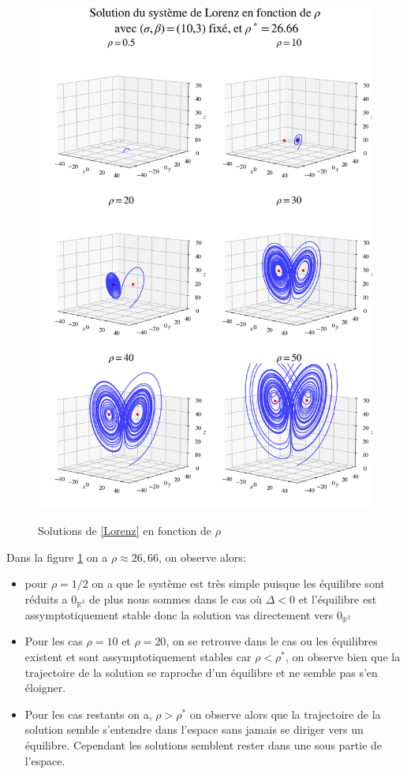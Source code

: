 \documentclass{article}
\newcommand{\R}{\mathbb{R}}
\newtheorem[M , nocut]{prop}{Proposition}[section]
\newtheorem[M , nocut]{definition}{Définition}
\newtheorem[M , nocut]{lemme}{Lemme}
\newtheorem[L , nocut]{thm}{Théoreme}
\newtheorem[M , nocut]{cor}{Corollaire}
\begin{document}
\begin{figure}[!ht]
    \begin{center}
        
        \includegraphics[height=0.73\textheight]{Eq-Spm}
        \label{fig:Eq-Spm}
        \caption{Solutions de \eqref{Lorenz} en fonction de $\rho$}
    \end{center}
\end{figure}

Dans la figure \ref{fig:Eq-Spm} on a $\rho \approx 26,66$, on observe alors:
\begin{itemize}
    \item pour $\rho = 1/2$ on a que le système est très simple puisque les équilibre sont réduits a $0_{\R^3}$ de plus nous sommes dans le cas où $\Delta < 0$ et l'équilibre est assymptotiquement stable donc la solution vas directement vers $0_{\R^3}$
    \item  Pour les cas $\rho = 10$ et $\rho =20$, on se retrouve dans le cas ou les équilibres existent et sont assymptotiquement stables car $\rho<\rho^*$, on observe bien que la trajectoire de la solution se raproche d'un équilibre et ne semble pas s'en éloigner.
    \item Pour les cas restants on a, $\rho>\rho^*$ on observe alors que la trajectoire de la solution semble s'entendre dans l'espace sans jamais se diriger vers un équilibre. Cependant les solutions semblent rester dans une sous partie de l'espace.
\end{itemize}
\end{document}
